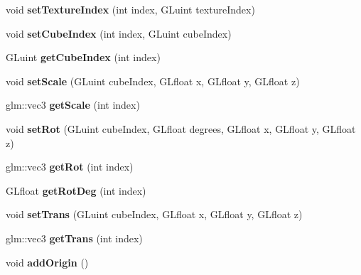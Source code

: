 \begin{DoxyCompactItemize}
void {\bfseries set\+Texture\+Index} (int index, G\+Luint texture\+Index)
\item 
\mbox{\label{classglimac_1_1CubeList_a6c10e49604014aa116a315aacbe6c850}} 
void {\bfseries set\+Cube\+Index} (int index, G\+Luint cube\+Index)
\item 
\mbox{\label{classglimac_1_1CubeList_a478146f5afac2969a3ad1ac698f82233}} 
G\+Luint {\bfseries get\+Cube\+Index} (int index)
\item 
\mbox{\label{classglimac_1_1CubeList_ab17bd322f6e0cdbd47dcbd223d1d8a64}} 
void {\bfseries set\+Scale} (G\+Luint cube\+Index, G\+Lfloat x, G\+Lfloat y, G\+Lfloat z)
\item 
\mbox{\label{classglimac_1_1CubeList_a971af62dbe232b6f892950877b473ce8}} 
glm\+::vec3 {\bfseries get\+Scale} (int index)
\item 
\mbox{\label{classglimac_1_1CubeList_a5467702fb89dddbe2de895f8084e6bf3}} 
void {\bfseries set\+Rot} (G\+Luint cube\+Index, G\+Lfloat degrees, G\+Lfloat x, G\+Lfloat y, G\+Lfloat z)
\item 
\mbox{\label{classglimac_1_1CubeList_a3e5204a3a5dcbd5dba00f6c698e14b65}} 
glm\+::vec3 {\bfseries get\+Rot} (int index)
\item 
\mbox{\label{classglimac_1_1CubeList_a2fcc0c5d9cb7b132470f59184523fa52}} 
G\+Lfloat {\bfseries get\+Rot\+Deg} (int index)
\item 
\mbox{\label{classglimac_1_1CubeList_aa0c7fddc0f17997c0ed50010575ee19c}} 
void {\bfseries set\+Trans} (G\+Luint cube\+Index, G\+Lfloat x, G\+Lfloat y, G\+Lfloat z)
\item 
\mbox{\label{classglimac_1_1CubeList_a0cde495f2fd93b28028459fd07d7be5e}} 
glm\+::vec3 {\bfseries get\+Trans} (int index)
\item 
\mbox{\label{classglimac_1_1CubeList_a9ef8478602bab51965e25100bc109562}} 
void {\bfseries add\+Origin} ()

\end{DoxyCompactItemize}
